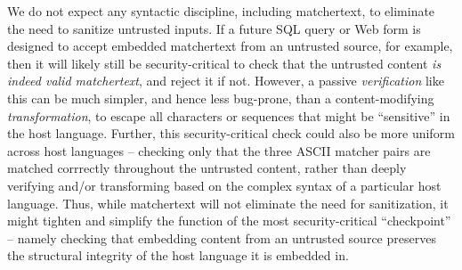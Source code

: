 We do not expect any syntactic discipline, including matchertext,
to eliminate the need to sanitize untrusted inputs.
If a future SQL query or Web form is designed to accept
embedded matchertext from an untrusted source, for example,
then it will likely still be security-critical to check
that the untrusted content \emph{is indeed valid matchertext},
and reject it if not.
However, a passive \emph{verification} like this
can be much simpler, and hence less bug-prone,
than a content-modifying \emph{transformation},
to escape all characters or sequences that might be ``sensitive''
in the host language.
Further, this security-critical check
could also be more uniform across host languages --
\ie checking only that the three ASCII matcher pairs are matched corrrectly
throughout the untrusted content,
rather than deeply verifying and/or transforming
based on the complex syntax of a particular host language.
Thus, while matchertext will not eliminate the need for sanitization,
it might tighten and simplify
the function of the most security-critical ``checkpoint'' --
namely checking that embedding content from an untrusted source
preserves the structural integrity
of the host language it is embedded in.

